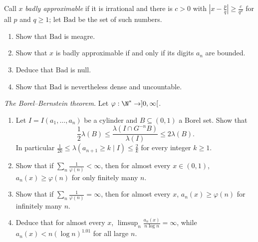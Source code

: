 \begin{exercise}[$\star$]\label{pb:badnull}
Call $x$ \emph{badly approximable} if it is irrational and there is $c>0$ with $|x-\frac pq|\ge\frac c{q^2}$ for all $p$ and $q\ge1$; let
$\mathrm{Bad}$ be the set of such numbers.
\begin{enumerate}[label=(\alph*)]
\item Show that $\mathrm{Bad}$ is meagre.
\item Show that $x$ is badly approximable if and only if its digits $a_n$ are bounded.
\item Deduce that $\mathrm{Bad}$ is null.
\item Show that $\mathrm{Bad}$ is nevertheless dense and uncountable.
\end{enumerate}
\end{exercise}

\begin{exercise}[$\star\star$]\label{pb:borelbernstein}
\emph{The Borel--Bernstein theorem.} Let $\varphi:\N^*\to]0,\infty[$.
\begin{enumerate}[label=(\alph*)]
\item Let $I=I(a_1,\dots,a_n)$ be a cylinder and $B\subseteq(0,1)$ a Borel set. Show that
\[
\frac12\lambda(B)\le\frac{\lambda(I\cap G^{-n}B)}{\lambda(I)}\le2\lambda(B).
\]
In particular $\frac1{2k}\le\lambda(a_{n+1}\ge k\mid I)\le\frac2k$ for every integer $k\ge1$.
\item Show that if $\sum_n\frac1{\varphi(n)}<\infty$, then for almost every $x\in(0,1)$, $a_n(x)\ge\varphi(n)$ for only finitely many $n$.
\item Show that if $\sum_n\frac1{\varphi(n)}=\infty$, then for almost every $x$, $a_n(x)\ge\varphi(n)$ for infinitely many $n$.
\item Deduce that for almost every $x$, $\limsup_n\frac{a_n(x)}{n\log n}=\infty$, while $a_n(x)<n(\log n)^{1.01}$ for all large $n$.
\end{enumerate}
\end{exercise}

